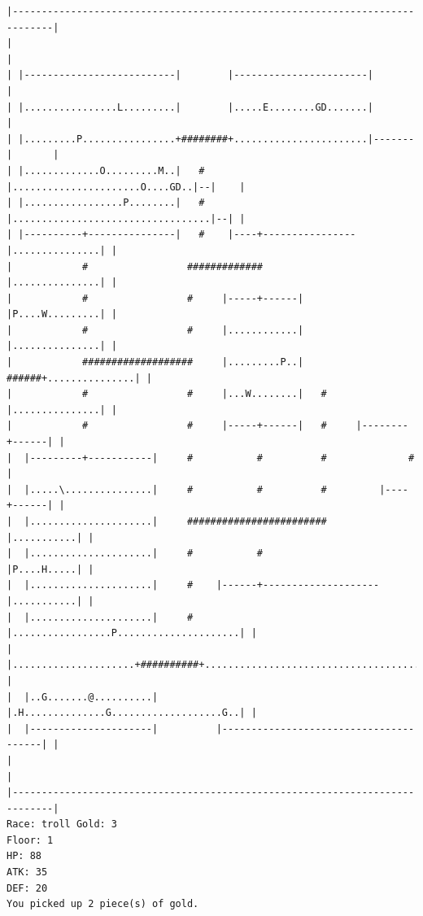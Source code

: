 \documentclass[11pt]{article}
\theoremstyle{plain}
\begin{document}
\begin{Verbatim}[fontsize=\scriptsize]
|-----------------------------------------------------------------------------|
|                                                                             |
| |--------------------------|        |-----------------------|               |
| |................L.........|        |.....E........GD.......|               |
| |.........P................+########+.......................|-------|       |
| |.............O.........M..|   #    |......................O....GD..|--|    |
| |.................P........|   #    |..................................|--| |
| |----------+---------------|   #    |----+----------------|...............| |
|            #                 #############                |...............| |
|            #                 #     |-----+------|         |P....W.........| |
|            #                 #     |............|         |...............| |
|            ###################     |.........P..|   ######+...............| |
|            #                 #     |...W........|   #     |...............| |
|            #                 #     |-----+------|   #     |--------+------| |
|  |---------+-----------|     #           #          #              #        |
|  |.....\...............|     #           #          #         |----+------| |
|  |.....................|     ########################         |...........| |
|  |.....................|     #           #                    |P....H.....| |
|  |.....................|     #    |------+--------------------|...........| |
|  |.....................|     #    |.................P.....................| |
|  |.....................+##########+.......................................| |
|  |..G.......@..........|          |.H..............G...................G..| |
|  |---------------------|          |---------------------------------------| |
|                                                                             |
|-----------------------------------------------------------------------------|
Race: troll Gold: 3                                                    Floor: 1
HP: 88
ATK: 35
DEF: 20
You picked up 2 piece(s) of gold. 
\end{Verbatim}
\newpage
\end{document}
